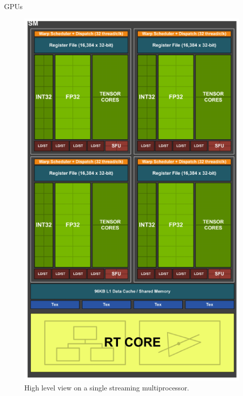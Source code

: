 \documentclass[10pt]{beamer}
\begin{document}
\begin{frame}[allowframebreaks]{GPUs}
\begin{figure}
\begin{center}
       \includegraphics[keepaspectratio, width=\textwidth,height=0.9\textheight-4\baselineskip]{img/210_turing_sm.png}
      \end{center}
      \caption{High level view on a single streaming multiprocessor.~\autocite{nvidia}}
      \end{figure}
\end{frame}
\end{document}

